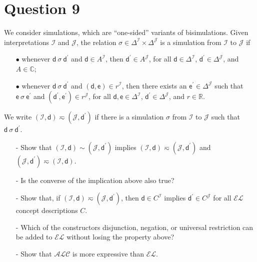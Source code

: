 \documentclass{article}
\begin{document}
    \section{Question 9}
    We consider simulations, which are ``one-sided'' variants of bisimulations. Given interpretations $\mathcal{I}$ and $\mathcal{J}$, the relation $\sigma\in\Delta^{\mathcal{I}}\times\Delta^{\mathcal{J}}$ is a simulation from $\mathcal{I}$ to $\mathcal{J}$ if
    \begin{itemize}
        \item[$\bullet$] whenever $\textsf{d}~\sigma~\textsf{d}^{\prime}$ and $\textsf{d}\in A^{\mathcal{I}}$, then $\textsf{d}^{\prime}\in A^{\mathcal{J}}$, for all $\textsf{d}\in\Delta^{\mathcal{I}}$, $\textsf{d}^{\prime}\in\Delta^{\mathcal{J}}$, and $A\in\mathbb{C}$;
        \item[$\bullet$] whenever $\textsf{d}~\sigma~\textsf{d}^{\prime}$ and $(\textsf{d},\textsf{e})\in r^{\mathcal{I}}$, then there exists an $\textsf{e}^{\prime}\in\Delta^{\mathcal{J}}$ such that $\textsf{e}~\sigma~\textsf{e}^{\prime}$ and $(\textsf{d}^{\prime},\textsf{e}^{\prime})\in r^{\mathcal{J}}$, for all $\textsf{d},\textsf{e}\in\Delta^{\mathcal{I}}$, $\textsf{d}^{\prime}\in\Delta^{\mathcal{J}}$, and $r\in\mathbb{R}$.
    \end{itemize}
    We write $(\mathcal{I},\textsf{d})\eqsim(\mathcal{J},\textsf{d}^{\prime})$ if there is a simulation $\sigma$ from $\mathcal{I}$ to $\mathcal{J}$ such that $\textsf{d}~\sigma~\textsf{d}^{\prime}$.
    \begin{itemize}
        \item[-] Show that $(\mathcal{I},\textsf{d})\sim(\mathcal{J},\textsf{d}^{\prime})$ implies $(\mathcal{I},\textsf{d})\eqsim(\mathcal{J},\textsf{d}^{\prime})$ and $(\mathcal{J},\textsf{d}^{\prime})\eqsim(\mathcal{I},\textsf{d})$.
        \item[-] Is the converse of the implication above also true?
        \item[-] Show that, if $(\mathcal{I},\textsf{d})\eqsim(\mathcal{J},\textsf{d}^{\prime})$, then $\textsf{d}\in C^{\mathcal{I}}$ implies $\textsf{d}^{\prime}\in C^{\mathcal{J}}$ for all $\mathcal{EL}$ concept descriptions $C$.
        \item[-] Which of the constructors disjunction, negation, or universal restriction can be added to $\mathcal{EL}$ without losing the property above?
        \item[-] Show that $\mathcal{ALC}$ is more expressive than $\mathcal{EL}$.
    \end{itemize}
\end{document}
